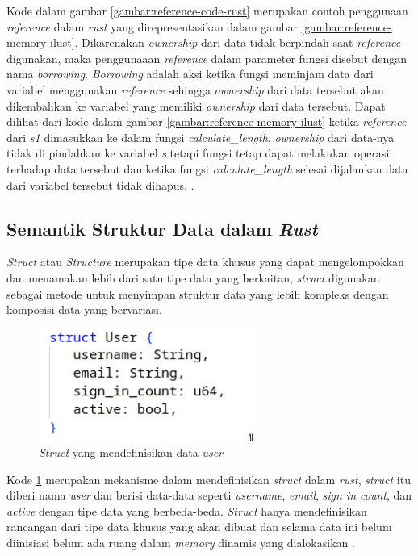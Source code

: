 Kode dalam gambar \ref{gambar:reference-code-rust} merupakan contoh penggunaan \emph{reference} dalam \emph{rust} yang direpresentasikan dalam gambar \ref{gambar:reference-memory-ilust}. Dikarenakan \emph{ownership} dari data tidak berpindah saat \emph{reference} digunakan, maka penggunaaan \emph{reference} dalam parameter fungsi disebut dengan nama \emph{borrowing}. \emph{Borrowing} adalah aksi ketika fungsi meminjam data dari variabel menggunakan \emph{reference} sehingga \emph{ownership} dari data tersebut akan dikembalikan ke variabel yang memiliki \emph{ownership} dari data tersebut. Dapat dilihat dari kode dalam gambar \ref{gambar:reference-memory-ilust} ketika \emph{reference} dari \emph{s1} dimasukkan ke dalam fungsi \emph{calculate\_length}, \emph{ownership} dari data-nya tidak di pindahkan ke variabel \emph{s} tetapi fungsi tetap dapat melakukan operasi terhadap data tersebut dan ketika fungsi \emph{calculate\_length} selesai dijalankan data dari variabel tersebut tidak dihapus.  \citep{rustbook}.

\subsection{Semantik Struktur Data dalam \emph{Rust}}

\emph{Struct} atau \emph{Structure} merupakan tipe data khusus yang dapat mengelompokkan dan menamakan lebih dari satu tipe data yang berkaitan, \emph{struct} digunakan sebagai metode untuk menyimpan struktur data yang lebih kompleks dengan komposisi data yang bervariasi.\citep{rustbook}

\begin{figure}[H]
  \centering
  \includegraphics[keepaspectratio, width=7cm]{gambar/struct-declare-rust.png}
  \caption{\emph{Struct} yang mendefinisikan data \emph{user} \citep{rustbook}}
  \label{gambar:struct-definition-rust}
\end{figure}

Kode \ref{gambar:struct-definition-rust} merupakan mekanisme dalam mendefinisikan \emph{struct} dalam \emph{rust}, \emph{struct} itu diberi nama \emph{user} dan berisi data-data seperti \emph{username}, \emph{email}, \emph{sign in count}, dan \emph{active} dengan tipe data yang berbeda-beda. \emph{Struct} hanya mendefinisikan rancangan dari tipe data khusus yang akan dibuat dan selama data ini belum diinisiasi belum ada ruang dalam \emph{memory} dinamis yang dialokasikan \citep{rustbook}.

